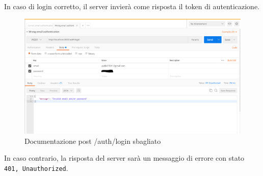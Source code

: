 In caso di login corretto, il server invierà come risposta il token di autenticazione.
\begin{figure}[h]
	\centering
	\includegraphics[scale=0.42]{Immagini/wrong_auth.png}
	\caption{Documentazione post /auth/login sbagliato}
\end{figure}
In caso contrario, la risposta del server sarà un messaggio di errore con stato \texttt{401, Unauthorized}.